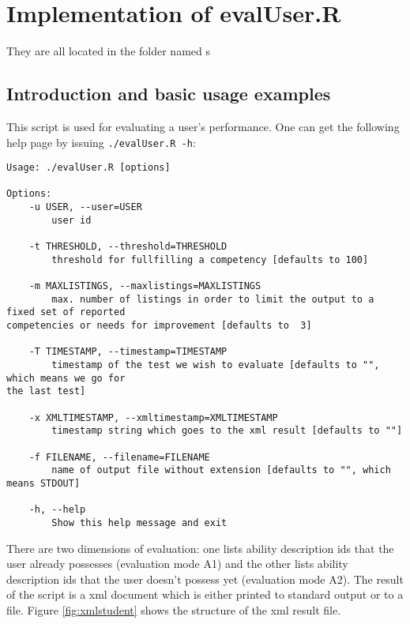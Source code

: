 \documentclass{scrartcl}
\begin{document}
\section{Implementation of evalUser.R}
They are all located in the folder named s
\subsection{Introduction and basic usage examples}
This script is used for evaluating a user's performance. One can get the following help page by issuing \verb+./evalUser.R -h+:
\begin{verbatim}
Usage: ./evalUser.R [options]

Options:
	-u USER, --user=USER
		user id

	-t THRESHOLD, --threshold=THRESHOLD
		threshold for fullfilling a competency [defaults to 100]

	-m MAXLISTINGS, --maxlistings=MAXLISTINGS
		max. number of listings in order to limit the output to a fixed set of reported 
competencies or needs for improvement [defaults to  3]

	-T TIMESTAMP, --timestamp=TIMESTAMP
		timestamp of the test we wish to evaluate [defaults to "", which means we go for 
the last test]

	-x XMLTIMESTAMP, --xmltimestamp=XMLTIMESTAMP
		timestamp string which goes to the xml result [defaults to ""]

	-f FILENAME, --filename=FILENAME
		name of output file without extension [defaults to "", which means STDOUT]

	-h, --help
		Show this help message and exit
\end{verbatim}
There are two dimensions of evaluation: one lists ability description ids that the user already possesses (evaluation mode A1) and the other lists ability description ids that the user doesn't possess yet (evaluation mode A2). The result of the script is a xml document which is either printed to standard output or to a file. Figure \ref{fig:xmlstudent} shows the structure of the xml result file.
\end{document}
